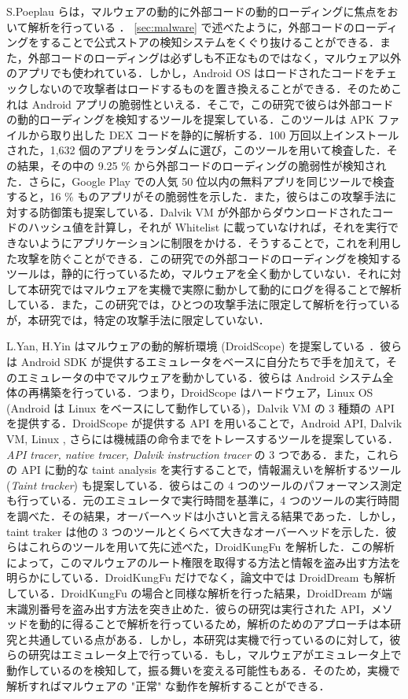 S.Poeplau らは，マルウェアの動的に外部コードの動的ローディングに焦点をおいて解析を行っている \cite{dynamicloading} ． \ref{sec:malware} で述べたように，外部コードのローディングをすることで公式ストアの検知システムをくぐり抜けることができる．また，外部コードのローディングは必ずしも不正なものではなく，マルウェア以外のアプリでも使われている．しかし，Android OS はロードされたコードをチェックしないので攻撃者はロードするものを置き換えることができる．そのためこれは Android アプリの脆弱性といえる．そこで，この研究で彼らは外部コードの動的ローディングを検知するツールを提案している．このツールは APK ファイルから取り出した DEX コードを静的に解析する．100 万回以上インストールされた，1,632 個のアプリをランダムに選び，このツールを用いて検査した．その結果，その中の 9.25 \% から外部コードのローディングの脆弱性が検知された．さらに，Google Play  での人気 50 位以内の無料アプリを同じツールで検査すると，16 \% ものアプリがその脆弱性を示した．また，彼らはこの攻撃手法に対する防御策も提案している．Dalvik VM が外部からダウンロードされたコードのハッシュ値を計算し，それが Whitelist に載っていなければ，それを実行できないようにアプリケーションに制限をかける．そうすることで，これを利用した攻撃を防ぐことができる．この研究での外部コードのローディングを検知するツールは，静的に行っているため，マルウェアを全く動かしていない．それに対して本研究ではマルウェアを実機で実際に動かして動的にログを得ることで解析している．また，この研究では，ひとつの攻撃手法に限定して解析を行っているが，本研究では，特定の攻撃手法に限定していない．

L.Yan, H.Yin はマルウェアの動的解析環境 (DroidScope) を提案している \cite{droidscope} ．彼らは Android SDK が提供するエミュレータをベースに自分たちで手を加えて，そのエミュレータの中でマルウェアを動かしている．彼らは Android システム全体の再構築を行っている．つまり，DroidScope はハードウェア，Linux OS (Android は Linux をベースにして動作している)，Dalvik VM の 3 種類の API を提供する．DroidScope が提供する API を用いることで，Android API, Dalvik VM, Linux , さらには機械語の命令までをトレースするツールを提案している．{\it API tracer, native tracer, Dalvik instruction tracer} の 3 つである．また，これらの API に動的な taint analysis を実行することで，情報漏えいを解析するツール ({\it Taint tracker}) も提案している．彼らはこの 4 つのツールのパフォーマンス測定も行っている．元のエミュレータで実行時間を基準に，4 つのツールの実行時間を調べた．その結果，オーバーヘッドは小さいと言える結果であった．しかし，taint traker は他の 3 つのツールとくらべて大きなオーバーヘッドを示した．彼らはこれらのツールを用いて先に述べた，DroidKungFu を解析した．この解析によって，このマルウェアのルート権限を取得する方法と情報を盗み出す方法を明らかにしている．DroidKungFu だけでなく，論文中では DroidDream も解析している．DroidKungFu の場合と同様な解析を行った結果，DroidDream が端末識別番号を盗み出す方法を突き止めた．彼らの研究は実行された API，メソッドを動的に得ることで解析を行っているため，解析のためのアプローチは本研究と共通している点がある．しかし，本研究は実機で行っているのに対して，彼らの研究はエミュレータ上で行っている．もし，マルウェアがエミュレータ上で動作しているのを検知して，振る舞いを変える可能性もある．そのため，実機で解析すればマルウェアの "正常" な動作を解析することができる．

